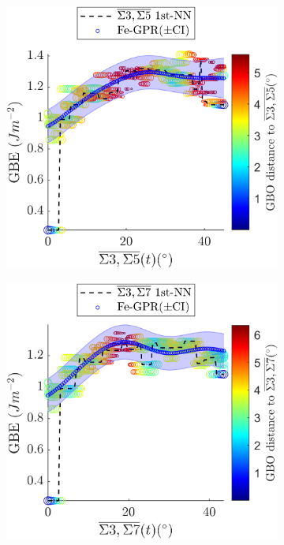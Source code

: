 \documentclass[final,twocolumn,12pt]{elsarticle}
\begin{document}
	\begin{figure}[!htb]
		\centering
		\begin{subfigure}[b]{0.4\textwidth}
			\includegraphics[width=\textwidth]{figures/tunnel-3-5-kim.png}
			\caption{}
			\label{fig:tunnel-3-5-kim}
		\end{subfigure}
		\begin{subfigure}[b]{0.4\textwidth}
			\includegraphics[width=\textwidth]{figures/tunnel-3-7-kim.png}
			\caption{}
			\label{fig:tunnel-3-7-kim}
		\end{subfigure}
		

\end{figure}
\end{document}
